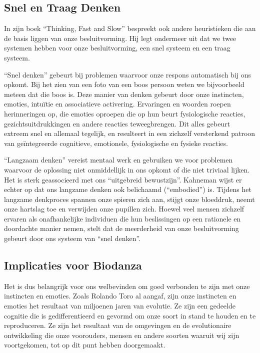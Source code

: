 \documentclass[
  11pt,
]{book}
\begin{document}
\hypertarget{snel-en-traag-denken}{%
\subsection{Snel en Traag Denken}\label{snel-en-traag-denken}}

In zijn boek ``Thinking, Fast and Slow'' bespreekt \citet{Kahneman2012} ook andere heuristieken die aan de basis liggen van onze besluitvorming. Hij legt ondermeer uit dat we twee systemen hebben voor onze besluitvorming, een snel systeem en een traag systeem.

``Snel denken'' gebeurt bij problemen waarvoor onze respons automatisch bij ons opkomt. Bij het zien van een foto van een boos persoon weten we bijvoorbeeld meteen dat die boos is. Deze manier van denken gebeurt door onze instincten, emoties, intuïtie en associatieve activering. Ervaringen en woorden roepen herinneringen op, die emoties oproepen die op hun beurt fysiologische reacties, gezichtsuitdrukkingen en andere reacties teweegbrengen. Dit alles gebeurt extreem snel en allemaal tegelijk, en resulteert in een zichzelf versterkend patroon van geïntegreerde cognitieve, emotionele, fysiologische en fysieke reacties.

``Langzaam denken'' vereist mentaal werk en gebruiken we voor problemen waarvoor de oplossing niet onmiddellijk in ons opkomt of die niet triviaal lijken. Het is sterk geassocieerd met ons ``uitgebreid bewustzijn''. Kahneman wijst er echter op dat ons langzame denken ook belichaamd (``embodied'') is. Tijdens het langzame denkproces spannen onze spieren zich aan, stijgt onze bloeddruk, neemt onze hartslag toe en verwijden onze pupillen zich. Hoewel veel mensen zichzelf ervaren als onafhankelijke individuen die hun beslissingen op een rationele en doordachte manier nemen, stelt \citet{Kahneman2012} dat de meerderheid van onze besluitvorming gebeurt door ons systeem van ``snel denken''.

\hypertarget{implicaties-voor-biodanza}{%
\subsection{Implicaties voor Biodanza}\label{implicaties-voor-biodanza}}

Het is dus belangrijk voor ons welbevinden om goed verbonden te zijn met onze instincten en emoties. Zoals Rolando Toro al aangaf, zijn onze instincten en emoties het resultaat van miljoenen jaren van evolutie. Ze zijn een gedeelde cognitie die is gedifferentieerd en gevormd om onze soort in stand te houden en te reproduceren. Ze zijn het resultaat van de omgevingen en de evolutionaire ontwikkeling die onze voorouders, mensen en andere soorten waaruit wij zijn voortgekomen, tot op dit punt hebben doorgemaakt.
\end{document}
